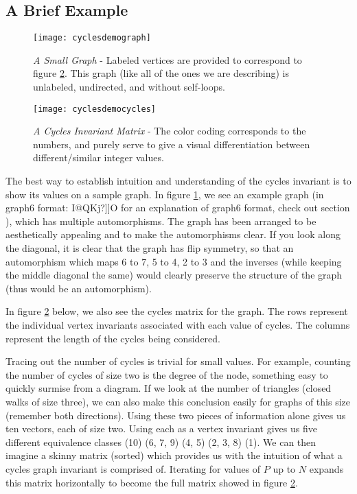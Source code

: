 \subsection{A Brief Example}

\begin{figure}[h]
\caption{\emph{A Small Graph} - Labeled vertices are provided to correspond to figure \ref{fig:cyclesdemocycles}. This graph (like all of the ones we are describing) is unlabeled, undirected, and without self-loops.}
\centering
\texttt{[image: cyclesdemograph]}
\label{fig:cyclesdemograph}
\end{figure}

\begin{figure}[h]
\caption{\emph{A Cycles Invariant Matrix} - The color coding corresponds to the numbers, and purely serve to give a visual differentiation between different/similar integer values.}
\centering
\texttt{[image: cyclesdemocycles]}
\label{fig:cyclesdemocycles}
\end{figure}

The best way to establish intuition and understanding of the cycles invariant is to show its values on a sample graph.
In figure \ref{fig:cyclesdemograph}, we see an example graph (in graph6 format: I@QKj?]]O for an explanation of graph6 format, check out section \label{section:graph6}), which has multiple automorphisms.
The graph has been arranged to be aesthetically appealing and to make the automorphisms clear. 
If you look along the diagonal, it is clear that the graph has flip symmetry, so that an automorphism which maps 6 to 7, 5 to 4, 2 to 3 and the inverses (while keeping the middle diagonal the same) would clearly preserve the structure of the graph (thus would be an automorphism).

In figure \ref{fig:cyclesdemocycles} below, we also see the cycles matrix for the graph.
The rows represent the individual vertex invariants associated with each value of cycles.
The columns represent the length of the cycles being considered.

Tracing out the number of cycles is trivial for small values. 
For example, counting the number of cycles of size two is the degree of the node, something easy to quickly surmise from a diagram.
If we look at the number of triangles (closed walks of size three), we can also make this conclusion easily for graphs of this size (remember both directions).
Using these two pieces of information alone gives us ten vectors, each of size two.
Using each as a vertex invariant gives us five different equivalence classes (10) (6, 7, 9) (4, 5) (2, 3, 8) (1).
We can then imagine a skinny matrix (sorted) which provides us with the intuition of what a cycles graph invariant is comprised of.
Iterating for values of $P$ up to $N$ expands this matrix horizontally to become the full matrix showed in figure \ref{fig:cyclesdemocycles}.


